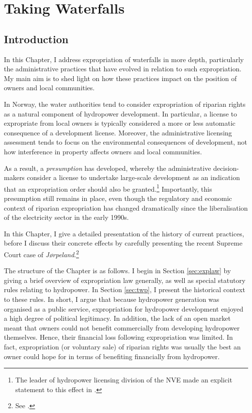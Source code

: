 \chapter{Taking Waterfalls}\label{chap:4}

\section{Introduction}\label{sec:intro4}

In this Chapter, I address expropriation of waterfalls in more depth, particularly the administrative practices that have evolved in relation to such expropriation. My main aim is to shed light on how these practices impact on the position of owners and local communities.

In Norway, the water authorities tend to consider expropriation of riparian rights as a natural component of hydropower development. In particular, a license to expropriate from local owners is typically considered a more or less automatic consequence of a development license. Moreover, the administrative licensing assessment tends to focus on the environmental consequences of development, not how interference in property affects owners and local communities.

As a result, a {\it presumption} has
developed, whereby the administrative decision-makers consider a license to undertake large-scale development as an indication that an expropriation order should also be granted.\footnote{The leader of hydropower licensing division of the NVE made an explicit statement to this effect in \cite{flatby08}.} Importantly, this presumption still remains in place, even though the regulatory and economic context of riparian expropriation has changed dramatically since the liberalisation of the electricity sector in the early 1990s. 

In this Chapter, I give a detailed presentation of the history of current practices, before I discuss their concrete effects by carefully presenting the recent Supreme Court case of {\it Jørpeland}.\footnote{See \cite{jorpeland11}.}

The structure of the Chapter is as follows. I begin in Section \ref{sec:explaw} by giving a brief overview of expropriation law generally, as well as special statutory rules relating to hydropower. In Section \ref{sec:twp}, I present the historical context to these rules. In short, I argue that because hydropower generation was organised as a public service, expropriation for hydropower development enjoyed a high degree of political legitimacy. In addition, the lack of an open market meant that owners could not benefit commercially from developing hydropower themselves. Hence, their financial loss following expropriation was limited. In fact, expropriation (or voluntary sale) of riparian rights was usually the best an owner could hope for in terms of benefiting financially from hydropower.

